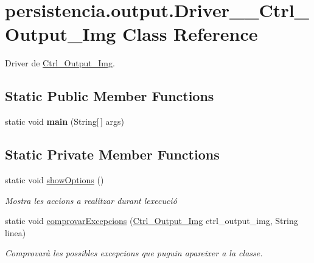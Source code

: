 \hypertarget{classpersistencia_1_1output_1_1Driver____Ctrl__Output__Img}{}\section{persistencia.\+output.\+Driver\+\_\+\+\_\+\+Ctrl\+\_\+\+Output\+\_\+\+Img Class Reference}
\label{classpersistencia_1_1output_1_1Driver____Ctrl__Output__Img}


Driver de \hyperlink{classpersistencia_1_1output_1_1Ctrl__Output__Img}{Ctrl\+\_\+\+Output\+\_\+\+Img}.  


\subsection*{Static Public Member Functions}
\begin{DoxyCompactItemize}
\item 
\mbox{\label{classpersistencia_1_1output_1_1Driver____Ctrl__Output__Img_a7ea6be01dbe68f043b4fb50b7ba41f8b}} 
static void {\bfseries main} (String\mbox{[}$\,$\mbox{]} args)
\end{DoxyCompactItemize}
\subsection*{Static Private Member Functions}
\begin{DoxyCompactItemize}
\item 
\mbox{\label{classpersistencia_1_1output_1_1Driver____Ctrl__Output__Img_a407a2c1e80b099b7cae5dd0a19683d09}} 
static void \hyperlink{classpersistencia_1_1output_1_1Driver____Ctrl__Output__Img_a407a2c1e80b099b7cae5dd0a19683d09}{show\+Options} ()
\begin{DoxyCompactList}\small\item\em Mostra les accions a realitzar durant l\textquotesingle{}execució \end{DoxyCompactList}\item 
static void \hyperlink{classpersistencia_1_1output_1_1Driver____Ctrl__Output__Img_ab6af9c875a2582dbb7e466be9bb6bbbb}{comprovar\+Excepcions} (\hyperlink{classpersistencia_1_1output_1_1Ctrl__Output__Img}{Ctrl\+\_\+\+Output\+\_\+\+Img} ctrl\+\_\+output\+\_\+img, String linea)
\begin{DoxyCompactList}\small\item\em Comprovarà les possibles excepcions que puguin apareixer a la classe. \end{DoxyCompactList}\end{DoxyCompactItemize}


